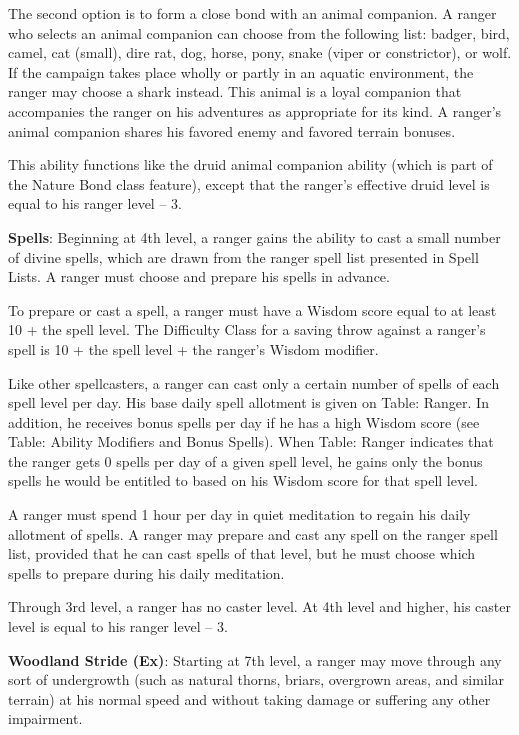 The second option is to form a close bond with an animal companion. A ranger who selects an animal companion can choose from the following list: badger, bird, camel, cat (small), dire rat, dog, horse, pony, snake (viper or constrictor), or wolf. If the campaign takes place wholly or partly in an aquatic environment, the ranger may choose a shark instead. This animal is a loyal companion that accompanies the ranger on his adventures as appropriate for its kind. A ranger's animal companion shares his favored enemy and favored terrain bonuses.
				
This ability functions like the druid animal companion ability (which is part of the Nature Bond class feature), except that the ranger's effective druid level is equal to his ranger level -- 3.
				
\textbf{Spells}: Beginning at 4th level, a ranger gains the ability to cast a small number of divine spells, which are drawn from the ranger spell list presented in Spell Lists. A ranger must choose and prepare his spells in advance.
				
To prepare or cast a spell, a ranger must have a Wisdom score equal to at least 10 + the spell level. The Difficulty Class for a saving throw against a ranger's spell is 10 + the spell level + the ranger's Wisdom modifier.
				
Like other spellcasters, a ranger can cast only a certain number of spells of each spell level per day. His base daily spell allotment is given on Table: Ranger. In addition, he receives bonus spells per day if he has a high Wisdom score (see Table: Ability Modifiers and Bonus Spells). When Table: Ranger indicates that the ranger gets 0 spells per day of a given spell level, he gains only the bonus spells he would be entitled to based on his Wisdom score for that spell level.
				
A ranger must spend 1 hour per day in quiet meditation to regain his daily allotment of spells. A ranger may prepare and cast any spell on the ranger spell list, provided that he can cast spells of that level, but he must choose which spells to prepare during his daily meditation.
				
Through 3rd level, a ranger has no caster level. At 4th level and higher, his caster level is equal to his ranger level -- 3.
				
\textbf{Woodland Stride (Ex)}: Starting at 7th level, a ranger may move through any sort of undergrowth (such as natural thorns, briars, overgrown areas, and similar terrain) at his normal speed and without taking damage or suffering any other impairment.
				
